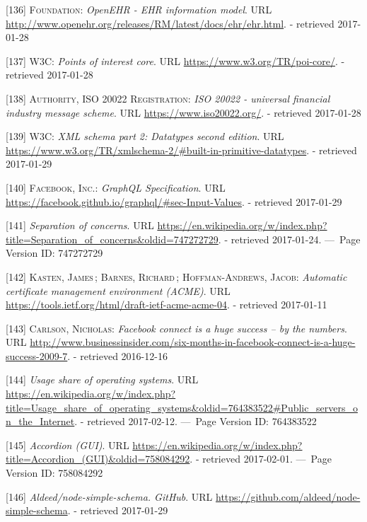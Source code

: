 \documentclass[12pt,english,a4paper,titlepage,cleardoublepage=empty,dottedtoc]{report}
\begin{document}
\hypertarget{ref-web_spec_data-schemas_ehr}{}
{[}136{]} \textsc{Foundation}: \emph{OpenEHR - EHR information model}.
URL \url{http://www.openehr.org/releases/RM/latest/docs/ehr/ehr.html}. -
retrieved 2017-01-28

\hypertarget{ref-web_spec_data-schemas_poi}{}
{[}137{]} \textsc{W3C}: \emph{Points of interest core}. URL
\url{https://www.w3.org/TR/poi-core/}. - retrieved 2017-01-28

\hypertarget{ref-web_spec_data-schemas_bank-transfer}{}
{[}138{]} \textsc{Authority, ISO 20022 Registration}: \emph{ISO 20022 -
universal financial industry message scheme}. URL
\url{https://www.iso20022.org/}. - retrieved 2017-01-28

\hypertarget{ref-web_spec_xml_types}{}
{[}139{]} \textsc{W3C}: \emph{XML schema part 2: Datatypes second
edition}. URL
\url{https://www.w3.org/TR/xmlschema-2/\#built-in-primitive-datatypes}.
- retrieved 2017-01-29

\hypertarget{ref-web_spec_graphql_types}{}
{[}140{]} \textsc{Facebook, Inc.}: \emph{GraphQL Specification}. URL
\url{https://facebook.github.io/graphql/\#sec-Input-Values}. - retrieved
2017-01-29

\hypertarget{ref-web_2016_wikipedia_separation-of-concerns}{}
{[}141{]} \emph{Separation of concerns}. URL
\url{https://en.wikipedia.org/w/index.php?title=Separation_of_concerns\&oldid=747272729}.
- retrieved 2017-01-24. ---~Page Version ID: 747272729

\hypertarget{ref-web_spec_acme}{}
{[}142{]} \textsc{Kasten, James}\,; \textsc{Barnes, Richard}\,;
\textsc{Hoffman-Andrews, Jacob}: \emph{Automatic certificate management
environment (ACME)}. URL
\url{https://tools.ietf.org/html/draft-ietf-acme-acme-04}. - retrieved
2017-01-11

\hypertarget{ref-web_2009-success-of-facebook-connect}{}
{[}143{]} \textsc{Carlson, Nicholas}: \emph{Facebook connect is a huge
success -- by the numbers}. URL
\url{http://www.businessinsider.com/six-months-in-facebook-connect-is-a-huge-success-2009-7}.
- retrieved 2016-12-16

\hypertarget{ref-web_2017_wikipedia_os-market-share}{}
{[}144{]} \emph{Usage share of operating systems}. URL
\url{https://en.wikipedia.org/w/index.php?title=Usage_share_of_operating_systems\&oldid=764383522\#Public_servers_on_the_Internet}.
- retrieved 2017-02-12. ---~Page Version ID: 764383522

\hypertarget{ref-web_2016_wikipedia_accordion-gui}{}
{[}145{]} \emph{Accordion (GUI)}. URL
\url{https://en.wikipedia.org/w/index.php?title=Accordion_(GUI)\&oldid=758084292}.
- retrieved 2017-02-01. ---~Page Version ID: 758084292

\hypertarget{ref-web_2017_repo_node-simple-schema}{}
{[}146{]} \emph{Aldeed/node-simple-schema. GitHub}. URL
\url{https://github.com/aldeed/node-simple-schema}. - retrieved
2017-01-29
\end{document}
